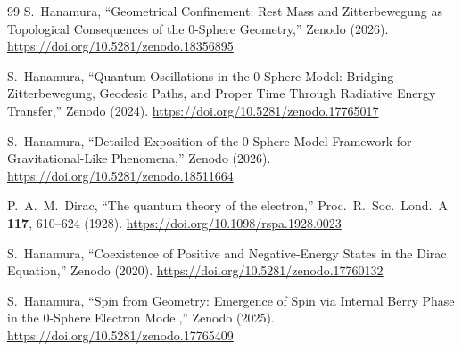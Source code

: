 \documentclass[12pt,letterpaper]{article}
\begin{document}
\begin{thebibliography}{99}
S.~Hanamura,
``Geometrical Confinement: Rest Mass and Zitterbewegung as Topological Consequences of the 0-Sphere Geometry,''
Zenodo (2026).
\href{https://doi.org/10.5281/zenodo.18356895}{https://doi.org/10.5281/zenodo.18356895}

S.~Hanamura,
``Quantum Oscillations in the 0-Sphere Model: Bridging Zitterbewegung, Geodesic Paths, and Proper Time Through Radiative Energy Transfer,''
Zenodo (2024).
\href{https://doi.org/10.5281/zenodo.17765017}{https://doi.org/10.5281/zenodo.17765017}

S.~Hanamura,
``Detailed Exposition of the 0-Sphere Model Framework for Gravitational-Like Phenomena,''
Zenodo (2026).
\href{https://doi.org/10.5281/zenodo.18511664}{https://doi.org/10.5281/zenodo.18511664}

P.~A.~M.~Dirac,
``The quantum theory of the electron,''
Proc.\ R.\ Soc.\ Lond.\ A \textbf{117}, 610--624 (1928).
\href{https://doi.org/10.1098/rspa.1928.0023}{https://doi.org/10.1098/rspa.1928.0023}

S.~Hanamura,
``Coexistence of Positive and Negative-Energy States in the Dirac Equation,''
Zenodo (2020).
\href{https://doi.org/10.5281/zenodo.17760132}{https://doi.org/10.5281/zenodo.17760132}

S.~Hanamura,
``Spin from Geometry: Emergence of Spin via Internal Berry Phase in the 0-Sphere Electron Model,''
Zenodo (2025).
\href{https://doi.org/10.5281/zenodo.17765409}{https://doi.org/10.5281/zenodo.17765409}

\end{thebibliography}
\end{document}
